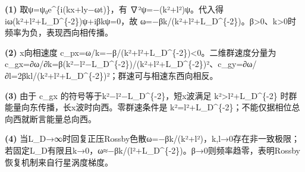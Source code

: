 \par\noindent\textbf{(1)} 取ψ=ψ₀e\textasciicircum{}\{i(kx+ly−ωt)\}，有 ∇²ψ=−(k²+l²)ψ。代入得 iω(k²+l²+L\_D\textasciicircum{}\{-2\})ψ+iβkψ=0，故 ω=−βk/(k²+l²+L\_D\textasciicircum{}\{-2\})。β>0、k>0时频率为负，表现西向相传播。
\par\noindent\textbf{(2)} x向相速度 c\_px=ω/k=−β/(k²+l²+L\_D\textasciicircum{}\{-2\})<0。二维群速度分量为 c\_gx=∂ω/∂k=β(k²−l²−L\_D\textasciicircum{}\{-2\})/(k²+l²+L\_D\textasciicircum{}\{-2\})²、c\_gy=∂ω/∂l=2βkl/(k²+l²+L\_D\textasciicircum{}\{-2\})²；群速可与相速东西向相反。
\par\noindent\textbf{(3)} 由于 c\_gx 的符号等于k²−l²−L\_D\textasciicircum{}\{-2\}，短x波满足 k²>l²+L\_D\textasciicircum{}\{-2\} 时群能量向东传播，长x波时向西。零群速条件是 k²=l²+L\_D\textasciicircum{}\{-2\}；不能仅据相位总向西就断言能量总向西。
\par\noindent\textbf{(4)} 当L\_D→∞时回复正压Rossby色散ω=−βk/(k²+l²)，k,l→0存在非一致极限；若固定L\_D有限且k→0，ω≈−βk/(l²+L\_D\textasciicircum{}\{-2\})。β→0则频率趋零，表明Rossby恢复机制来自行星涡度梯度。
